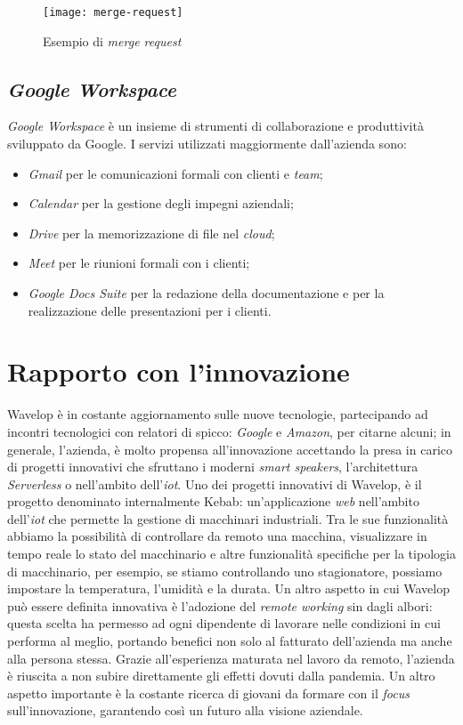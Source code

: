 \begin{figure}[!ht]
  \begin{center}
    \texttt{[image: merge-request]}
    \caption{Esempio di \emph{merge request}}
    \label{fig:mr}
  \end{center}
\end{figure}

\newpage
\subsection{\emph{Google Workspace}}
\emph{Google Workspace} è un insieme di strumenti di collaborazione e produttività sviluppato da Google. 
I servizi utilizzati maggiormente dall'azienda sono:
\begin{itemize}
  \item \emph{Gmail} per le comunicazioni formali con clienti e \emph{team};
  \item \emph{Calendar} per la gestione degli impegni aziendali;
  \item \emph{Drive} per la memorizzazione di file nel \emph{cloud};
  \item \emph{Meet} per le riunioni formali con i clienti;
  \item \emph{Google Docs Suite} per la redazione della documentazione e per la realizzazione delle presentazioni per i clienti.
\end{itemize}

\section{Rapporto con l'innovazione}
Wavelop è in costante aggiornamento sulle nuove tecnologie, partecipando ad incontri tecnologici con relatori di spicco: \emph{Google} e \emph{Amazon}, per citarne alcuni; in generale, l'azienda, è molto propensa all'innovazione accettando la presa in carico di progetti innovativi che sfruttano i moderni \emph{smart speakers}, l'architettura \emph{Serverless} o nell'ambito dell'\emph{\acrfull{iot}}. 
Uno dei progetti innovativi di Wavelop, è il progetto denominato internalmente Kebab: un'applicazione \emph{web} nell'ambito dell'\emph{\acrshort{iot}} che permette la gestione di macchinari industriali.
Tra le sue funzionalità abbiamo la possibilità di controllare da remoto una macchina, visualizzare in tempo reale lo stato del macchinario e altre funzionalità specifiche per la tipologia di macchinario, per esempio, se stiamo controllando uno stagionatore, possiamo impostare la temperatura, l'umidità e la durata.
Un altro aspetto in cui Wavelop può essere definita innovativa è l'adozione del \emph{remote working} sin dagli albori: questa scelta ha permesso ad ogni dipendente di lavorare nelle condizioni in cui performa al meglio, portando benefici non solo al fatturato dell'azienda ma anche alla persona stessa. 
Grazie all'esperienza maturata nel lavoro da remoto, l'azienda è riuscita a non subire direttamente gli effetti dovuti dalla pandemia. 
Un altro aspetto importante è la costante ricerca di giovani da formare con il \emph{focus} sull'innovazione, garantendo così un futuro alla visione aziendale.